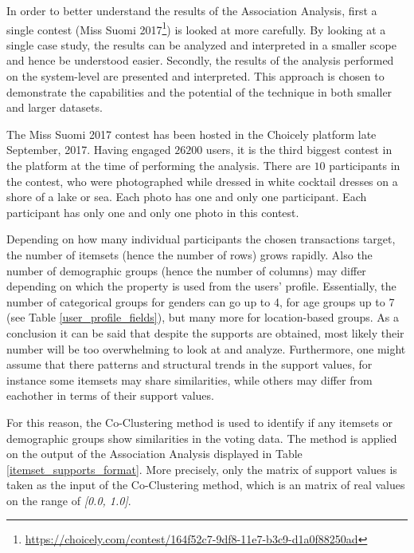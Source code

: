     In order to better understand the results of the Association Analysis, first a single contest (Miss Suomi 2017\footnote{\url{https://choicely.com/contest/164f52c7-9df8-11e7-b3c9-d1a0f88250ad}}) is looked at more carefully. By looking at a single case study, the results can be analyzed and interpreted in a smaller scope and hence be understood easier. Secondly, the results of the analysis performed on the system-level are presented and interpreted. This approach is chosen to demonstrate the capabilities and the potential of the technique in both smaller and larger datasets.

    The Miss Suomi 2017 contest has been hosted in the Choicely platform late September, 2017. Having engaged $26 200$ users, it is the third biggest contest in the platform at the time of performing the analysis. There are $10$ participants in the contest, who were photographed while dressed in white cocktail dresses on a shore of a lake or sea. Each photo has one and only one participant. Each participant has only one and only one photo in this contest. 
    
    Depending on how many individual participants the chosen transactions target, the number of itemsets (hence the number of rows) grows rapidly. Also the number of demographic groups (hence the number of columns) may differ depending on which the property is used from the users' profile. Essentially, the number of categorical groups for genders can go up to 4, for age groups up to 7 (see Table \ref{user_profile_fields}), but many more for location-based groups. As a conclusion it can be said that despite the supports are obtained, most likely their number will be too overwhelming to look at and analyze. Furthermore, one might assume that there patterns and structural trends in the support values, for instance some itemsets may share similarities, while others may differ from eachother in terms of their support values.

    For this reason, the Co-Clustering method is used to identify if any itemsets or demographic groups show similarities in the voting data. The method is applied on the output of the Association Analysis displayed in Table \ref{itemset_supports_format}. More precisely, only the matrix of support values is taken as the input of the Co-Clustering method, which is an matrix of real values on the range of \emph{[0.0, 1.0]}. 
    

